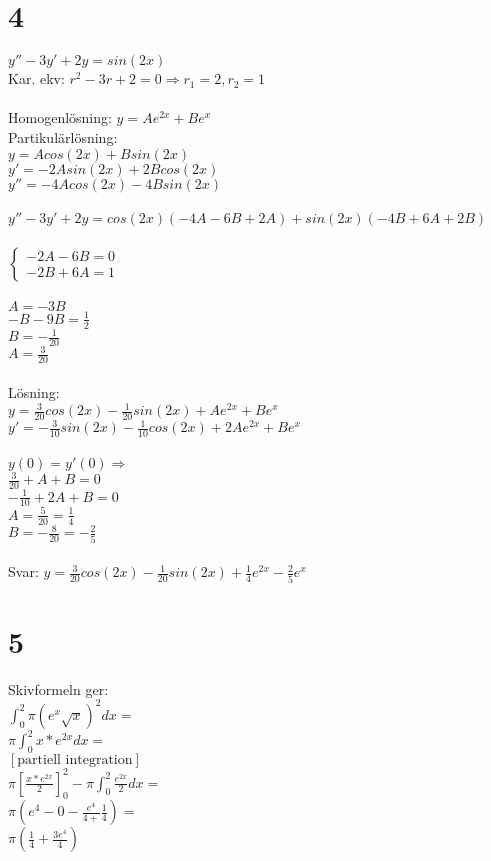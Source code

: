 \documentclass{article}
\begin{document}
\section*{4}
$y''-3y'+2y = sin(2x)$\\
Kar. ekv: $r^2-3r+2=0 \Rightarrow r_1 = 2, r_2 = 1$\\\\
Homogenlösning: $y = Ae^{2x} + Be^x$\\
Partikulärlösning: \\
$y = Acos(2x) + Bsin(2x)$\\
$y' = -2Asin(2x) + 2Bcos(2x)$\\
$y'' = -4Acos(2x) - 4Bsin(2x)$\\\\
$y''-3y'+2y = cos(2x)(-4A - 6B + 2A) + sin(2x)(-4B + 6A + 2B)$\\\\
$\left\{
    \begin{array}{l}
        -2A - 6B = 0\\
        -2B + 6A = 1
    \end{array}\right.$\\\\
$A = -3B$\\
$-B - 9B = \frac{1}{2}$\\
$B = -\frac{1}{20}$\\
$A = \frac{3}{20}$\\\\
Lösning:\\
$y = \frac{3}{20}cos(2x) - \frac{1}{20}sin(2x) + A e^{2x}+Be^x$\\
$y' = -\frac{3}{10}sin(2x) - \frac{1}{10} cos(2x) + 2Ae^{2x} + Be^x$\\\\
$y(0) = y'(0) \Rightarrow$\\
$\frac{3}{20} + A + B = 0$\\
$- \frac{1}{10} + 2A + B = 0$\\
$A = \frac{5}{20} = \frac{1}{4}$\\
$B = - \frac{8}{20} = - \frac{2}{5}$\\\\
Svar: $y=\frac{3}{20}cos(2x)-\frac{1}{20}sin(2x)+\frac{1}{4}e^{2x}-\frac{2}{5}e^x$

\section*{5}
Skivformeln ger:\\
$\int_{0}^{2} \pi (e^x\sqrt{x})^2 dx = $\\
$\pi \int_0^2 x*e^{2x}dx = $\\
$[\text{partiell integration}]$\\
$\pi [\frac{x*e^{2x}}{2}]_0^2 - \pi \int_0^2 \frac{e^{2x}}{2}dx = $\\
$\pi(e^4-0-\frac{e^4}{4+}\frac{1}{4}) = $\\
$\pi(\frac{1}{4} + \frac{3e^4}{4})$
\end{document}
